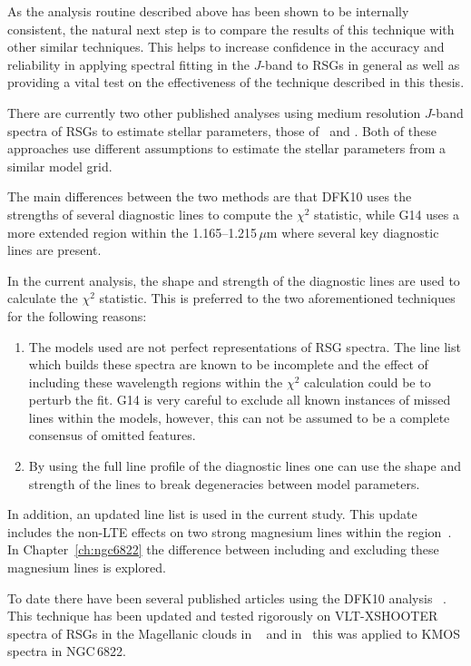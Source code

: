 As the analysis routine described above has been shown to be internally consistent, the natural next step is to compare the results of this technique with other similar techniques.
This helps to increase confidence in the accuracy and reliability in applying spectral fitting in the $J$-band to RSGs in general as well as providing a vital test on the effectiveness of the technique described in this thesis.

There are currently two other published analyses using medium resolution $J$-band spectra of RSGs to estimate stellar parameters,
those of~\cite[][DFK10]{2010MNRAS.407.1203D} and
\cite[][G14]{2014PhDT.........G}.
Both of these approaches use different assumptions to estimate the stellar parameters from a similar model grid.

The main differences between the two methods are that DFK10 uses the strengths of several diagnostic lines to compute the $\chi^{2}$ statistic,
while G14 uses a more extended region within the 1.165--1.215\,$\mu$m where several key diagnostic lines are present.

In the current analysis, the shape and strength of the diagnostic lines are used to calculate the $\chi^{2}$ statistic.
This is preferred to the two aforementioned techniques for the following reasons:

\begin{enumerate}
    \item The models used are not perfect representations of RSG spectra.
    The line list which builds these spectra are known to be incomplete and the effect of including these wavelength regions within the $\chi^{2}$ calculation could be to perturb the fit. G14 is very careful to exclude all known instances of missed lines within the models, however, this can not be assumed to be a complete consensus of omitted features.

    \item By using the full line profile of the diagnostic lines one can use the shape and strength of the lines to break degeneracies between model parameters.
\end{enumerate}

In addition, an updated line list is used in the current study.
This update includes the non-LTE effects on two strong magnesium lines within the region~\citep{2015ApJ...804..113B}.
In Chapter~\ref{ch:ngc6822} the difference between including and excluding these magnesium lines is explored.

To date there have been several published articles using the DFK10 analysis
~\citep{2010MNRAS.407.1203D,2015ApJ...806...21D,2015ApJ...803...14P}.
This technique has been updated and tested rigorously on VLT-XSHOOTER spectra of RSGs in the Magellanic clouds in
~\cite{2015ApJ...806...21D} and in~\citet[][which Chapter~\ref{ch:ngc6822} is based upon]{2015ApJ...803...14P} this was applied to KMOS spectra in NGC\,6822.

